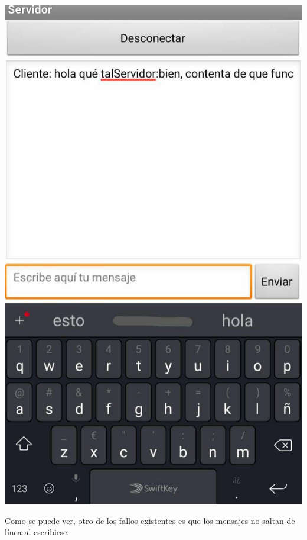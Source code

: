 \documentclass{article}
\begin{document}
\begin{flushleft}
	\includegraphics[scale=0.2]{imagenes/ChatServ.jpg} 
\end{flushleft}

Como se puede ver, otro de los fallos existentes es que los mensajes no saltan de línea al escribirse.
\end{document}
